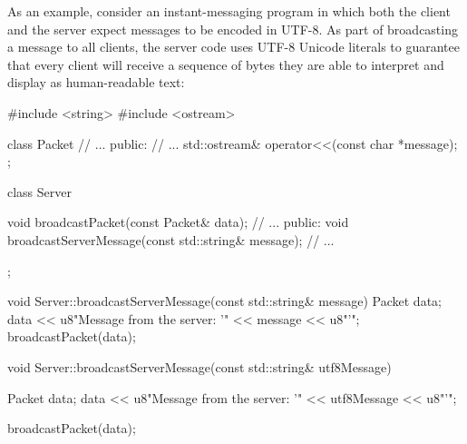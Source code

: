 As an example, consider an instant-messaging program in which both the
client and the server expect messages to be encoded in UTF-8. As part of
broadcasting a message to all clients, the server code uses UTF-8
Unicode literals to guarantee that every client will receive a sequence
of bytes they are able to interpret and display as human-readable text:

\begin{emcppshiddenlisting}
#include <string>                                                               
#include <ostream>                                                              
                                                                                
class Packet                                                                    
{                                                                               
    // ...                                                                      
public:                                                                         
    // ...                                                                      
    std::ostream&  operator<<(const char *message);                             
};                                                                              
                                                                                
                                                                                
class Server                                                                    
{                                                                               
    void broadcastPacket(const Packet& data);                                   
    // ...                                                                      
public:                                                                         
    void broadcastServerMessage(const std::string& message);                    
    // ...                                                                      
                                                                                
};                                                                              
                                                                                
void Server::broadcastServerMessage(const std::string& message)                 
{                                                                               
    Packet data;                                                                
    data << u8"Message from the server: '" << message << u8"'\n";               
    broadcastPacket(data);                                                      
}
\end{emcppshiddenlisting}
\begin{emcppslisting}[language=C++]
void Server::broadcastServerMessage(const std::string& utf8Message)
{
    Packet data;
    data << u8"Message from the server: '" << utf8Message << u8"'\n";

    broadcastPacket(data);
}
\end{emcppslisting}
    
